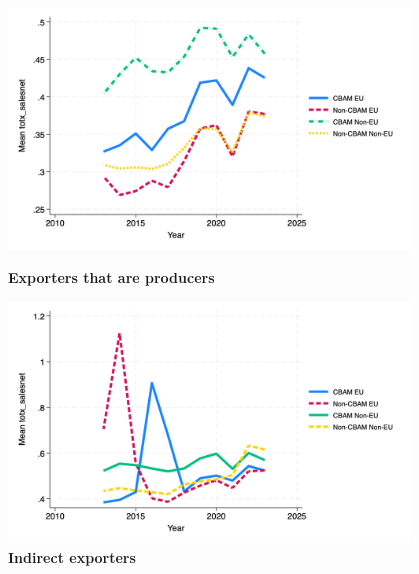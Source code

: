 \documentclass{article}
\begin{document}
\begin{figure}[H]
\centering
\includegraphics[width=0.95\textwidth]{totx_salesnet_ep.png}
\caption{\textbf{Exporters that are producers}}
\includegraphics[width=0.95\textwidth]{totx_salesnet_indir.png}
\caption{\textbf{Indirect exporters}}
\end{figure}
\end{document}

